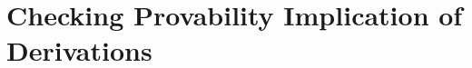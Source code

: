 \documentclass{new_tlp}
\newcommand\dnot{\ensuremath{\mathit{not}}\xspace}
\newcommand{\In}[2]{\ensuremath{\tsl{in}(\ensuremath{#1},\ensuremath{#2})}}
\begin{document}


\section{Checking Provability Implication of Derivations}
\label{sec:provIf}
\end{document}
